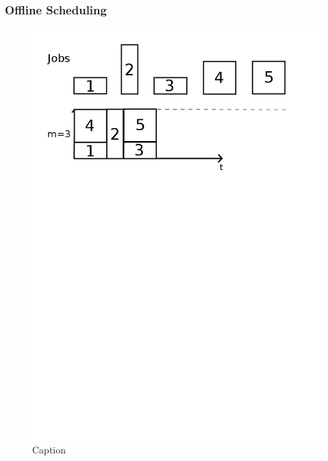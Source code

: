 \documentclass{beamer}
\begin{document}
\begin{frame}
  \frametitle{Offline Scheduling}
  \begin{figure}[H]
          \centering
          \includegraphics[width=\textwidth]{offline2.png}
          \caption{Caption}
          \label{fig:offline2_png}
  \end{figure}

\end{frame}

\end{document}
